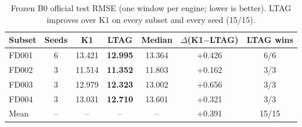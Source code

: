 \begin{table}[t]
\centering
\caption{Frozen B0 official test RMSE (one window per engine; lower is better).
LTAG improves over K1 on every subset and every seed (15/15).}
\label{tab:test}
\begin{tabular}{lcccccc}
\toprule
Subset & Seeds & K1 & LTAG & Median & $\Delta$(K1$-$LTAG) & LTAG wins \\
\midrule
FD001 & 6 & 13.421 & \textbf{12.995} & 13.364 & +0.426 & 6/6\\
FD002 & 3 & 11.514 & \textbf{11.352} & 11.803 & +0.162 & 3/3\\
FD003 & 3 & 12.979 & \textbf{12.323} & 13.002 & +0.656 & 3/3\\
FD004 & 3 & 13.031 & \textbf{12.710} & 13.601 & +0.321 & 3/3 \\
\midrule
Mean & -- & -- & -- & -- & +0.391 & 15/15 \\
\bottomrule
\end{tabular}
\end{table}
